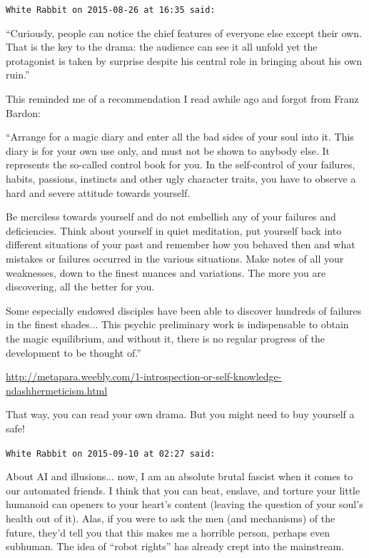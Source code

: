 \begin{footnotesize}
\begin{sffamily}
\texttt{White Rabbit on 2015-08-26 at 16:35 said:}

``Curiously, people can notice the chief features of everyone else except their own. That is the key to the drama: the audience can see it all unfold yet the protagonist is taken by surprise despite his central role in bringing about his own ruin.''

This reminded me of a recommendation I read awhile ago and forgot from Franz Bardon:

``Arrange for a magic diary and enter all the bad sides of your soul into it. This diary is for your own use only, and must not be shown to anybody else. It represents the so-called control book for you. In the self-control of your failures, habits, passions, instincts and other ugly character traits, you have to observe a hard and severe attitude towards yourself.

Be merciless towards yourself and do not embellish any of your failures and deficiencies. Think about yourself in quiet meditation, put yourself back into different situations of your past and remember how you behaved then and what mistakes or failures occurred in the various situations. Make notes of all your weaknesses, down to the finest nuances and variations. The more you are discovering, all the better for you.

Some especially endowed disciples have been able to discover hundreds of failures in the finest shades... This psychic preliminary work is indispensable to obtain the magic equilibrium, and without it, there is no regular progress of the development to be thought of.''

\url{http://metapara.weebly.com/1-introspection-or-self-knowledge-ndashhermeticism.html}


That way, you can read your own drama. But you might need to buy yourself a safe!

\hfill

\texttt{White Rabbit on 2015-09-10 at 02:27 said:}

About AI and illusions... now, I am an absolute brutal fascist when it comes to our automated friends. I think that you can beat, enslave, and torture your little humanoid can openers to your heart's content (leaving the question of your soul's health out of it). Alas, if you were to ask the men (and mechanisms) of the future, they'd tell you that this makes me a horrible person, perhaps even subhuman. The idea of ``robot rights'' has already crept into the mainstream.


\end{sffamily}
\end{footnotesize}
